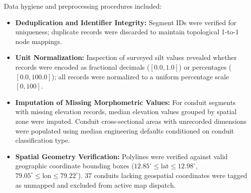 Data hygiene and preprocessing procedures included:
\begin{itemize}
    \item \textbf{Deduplication and Identifier Integrity:} Segment IDs were verified for uniqueness; duplicate records were discarded to maintain topological 1-to-1 node mappings.
    \item \textbf{Unit Normalization:} Inspection of surveyed silt values revealed whether records were encoded as fractional decimals ($[0.0, 1.0]$) or percentages ($[0.0, 100.0]$); all records were normalized to a uniform percentage scale $[0, 100]$.
    \item \textbf{Imputation of Missing Morphometric Values:} For conduit segments with missing elevation records, median elevation values grouped by spatial zone were imputed. Conduit cross-sectional areas with unrecorded dimensions were populated using median engineering defaults conditioned on conduit classification type.
    \item \textbf{Spatial Geometry Verification:} Polylines were verified against valid geographic coordinate bounding boxes ($12.85^\circ \le \text{lat} \le 12.98^\circ$, $79.05^\circ \le \text{lon} \le 79.22^\circ$). 37 conduits lacking geospatial coordinates were tagged as unmapped and excluded from active map dispatch.
\end{itemize}

